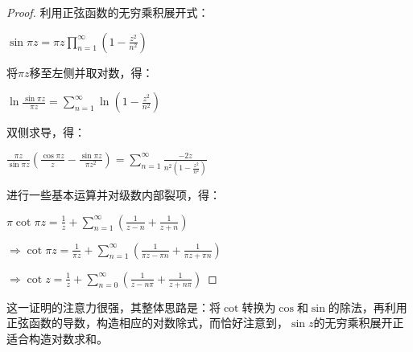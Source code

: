 \documentclass[12pt, a4paper, oneside, UTF8]{ctexbook}
\begin{document}
			\begin{proof}
				利用正弦函数的无穷乘积展开式：
				
				$\sin \pi z = \pi z \prod\limits_{n=1}^{\infty} \left(1-\frac{z^2}{n^2}\right)$
				
				将$\pi z$移至左侧并取对数，得：
				
				$\ln \frac{\sin \pi z}{\pi z} = \sum\limits_{n=1}^{\infty} \ln \left(1-\frac{z^2}{n^2}\right)$
				
				双侧求导，得：
				
				$\frac{\pi z}{\sin \pi z}\left(\frac{\cos \pi z}{z}-\frac{\sin \pi z}{\pi z^2}\right) = \sum\limits_{n=1}^{\infty} \frac{-2z}{n^2 (1-\frac{z^2}{n^2})}$
				
				进行一些基本运算并对级数内部裂项，得：
				
				$\pi \cot \pi z = \frac{1}{z}+\sum\limits_{n=1}^{\infty}\left(\frac{1}{z-n}+\frac{1}{z+n}\right)$
				
				$\Rightarrow \cot \pi z = \frac{1}{\pi z}+\sum\limits_{n=1}^{\infty}\left(\frac{1}{\pi z-\pi n}+\frac{1}{\pi z+\pi n}\right)$
				
				$\Rightarrow \cot z = \frac{1}{z}+\sum\limits_{n=0}^{\infty} \left(\frac{1}{z-n\pi}+\frac{1}{z+n\pi}\right)$
			\end{proof}
			这一证明的注意力很强，其整体思路是：将$\cot$转换为$\cos$和$\sin$的除法，再利用正弦函数的导数，构造相应的对数除式，而恰好注意到，$\sin z$的无穷乘积展开正适合构造对数求和。
\end{document}
